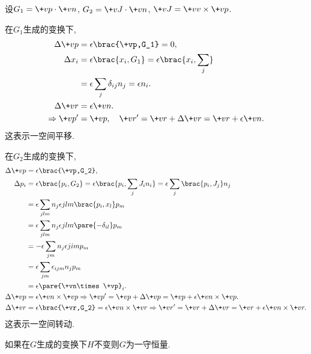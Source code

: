 \documentclass{ctexart}
\begin{document}
\begin{sample}
    \begin{ex}
        设$G_1 = \+vp\cdot\+vn$, $G_2 = \+vJ\cdot\+vn$, $\+vJ = \+vv\times\+vp$.
        \begin{cenum}
            \item 在$G_1$生成的变换下,
            \begin{align*}
                \Delta \+vp &= \epsilon\brac{\+vp,G_1} = 0, \\
                \Delta x_i &= \epsilon\brac{x_i,G_1} = \epsilon\brac{x_i,\sum_j} \\
                &= \epsilon \sum_j \delta_{ij}n_j = \epsilon n_i. \\
                \Delta\+vr &= \epsilon \+vn. \\
                \Rightarrow \+vp' &= \+vp,\quad \+vr' = \+vr+\Delta\+vr = \+vr + \epsilon \+vn.
            \end{align*}
            这表示一空间平移.
            \item 在$G_2$生成的变换下,
            \begin{align*}
                \Delta \+vp &= \epsilon\brac{\+vp,G_2}, \\
                \Delta p_i &= \epsilon\brac{p_i,G_2} = \epsilon\brac{p_i,\sum_j J_i n_i} = \epsilon \sum_j \brac{p_i,J_j}n_j \\
                &= \epsilon \sum_{jlm} n_j\epsilon{jlm}\brac{p_i,x_l}p_m \\
                &= \epsilon \sum_{jlm} n_j\epsilon{jlm}\pare{-\delta_{il}}p_m \\
                &= -\epsilon \sum_{jm} n_j \epsilon{jim}p_m \\
                &= \epsilon\sum_{jm}\epsilon_{ijm}n_j p_m \\
                &= \epsilon\pare{\+vn\times\+vp}_i. \\
                \Delta \+vp &= \epsilon \+vn\times \+vp \Rightarrow \+vp' = \+vp+\Delta \+vp = \+vp + \epsilon\+vn\times\+vp. \\
                \Delta \+vr &= \epsilon\brac{\+vr,G_2} = \epsilon\+vn\times\+vr\Rightarrow \+vr' = \+vr + \Delta\+vr = \+vr + \epsilon\+vn\times\+vr.
            \end{align*}
            这表示一空间转动.
        \end{cenum}
    \end{ex}
\end{sample}
\begin{remark}
    如果在$G$生成的变换下$H$不变则$G$为一守恒量.
\end{remark}
\end{document}

